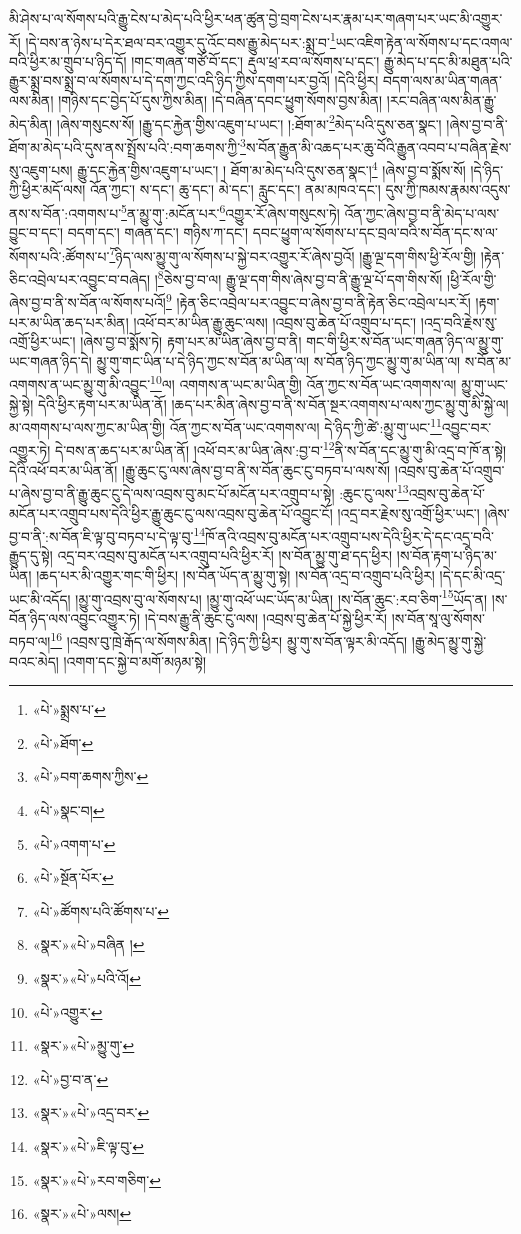 མི་ཤེས་པ་ལ་སོགས་པའི་རྒྱུ་ངེས་པ་མེད་པའི་ཕྱིར་ཕན་ཚུན་བྱེ་བྲག་ངེས་པར་རྣམ་པར་གཞག་པར་ཡང་མི་འགྱུར་རོ། །དེ་བས་ན་ཉེས་པ་དེར་ཐལ་བར་འགྱུར་དུ་འོང་བས་རྒྱུ་མེད་པར་:སྨྲ་བ་\footnote{«པེ་»སྨྲས་པ་}ཡང་འཇིག་རྟེན་ལ་སོགས་པ་དང་འགལ་བའི་ཕྱིར་མ་གྲུབ་པ་ཉིད་དོ། །གང་གཞན་གཙོ་བོ་དང་། རྡུལ་ཕྲ་རབ་ལ་སོགས་པ་དང་། རྒྱུ་མེད་པ་དང་མི་མཐུན་པའི་རྒྱུར་སྨྲ་བས་སྨྲ་བ་ལ་སོགས་པ་དེ་དག་ཀྱང་འདི་ཉིད་ཀྱིས་དགག་པར་བྱའོ། །དེའི་ཕྱིར། བདག་ལས་མ་ཡིན་གཞན་ལས་མིན། །གཉིས་དང་བྱེད་པོ་དུས་ཀྱིས་མིན། །དེ་བཞིན་དབང་ཕྱུག་སོགས་བྱས་མིན། །རང་བཞིན་ལས་མིན་རྒྱུ་མེད་མིན། །ཞེས་གསུངས་སོ། །རྒྱུ་དང་རྐྱེན་གྱིས་འཇུག་པ་ཡང་། །:ཐོག་མ་\footnote{«པེ་»ཐོག་}མེད་པའི་དུས་ཅན་སྣང་། །ཞེས་བྱ་བ་ནི་ཐོག་མ་མེད་པའི་དུས་ནས་སྤྲོས་པའི་:བག་ཆགས་ཀྱི་\footnote{«པེ་»བག་ཆགས་ཀྱིས་}ས་བོན་རྒྱུན་མི་འཆད་པར་ཆུ་བོའི་རྒྱུན་འབབ་པ་བཞིན་རྗེས་སུ་འཇུག་པས། རྒྱུ་དང་རྐྱེན་གྱིས་འཇུག་པ་ཡང་། །
ཐོག་མ་མེད་པའི་དུས་ཅན་སྣང་།\footnote{«པེ་»སྣང་བ།} །ཞེས་བྱ་བ་སྨོས་སོ། །དེ་ཉིད་ཀྱི་ཕྱིར་མདོ་ལས། འོན་ཀྱང་། ས་དང་། ཆུ་དང་། མེ་དང་། རླུང་དང་། ནམ་མཁའ་དང་། དུས་ཀྱི་ཁམས་རྣམས་འདུས་ནས་ས་བོན་:འགགས་པ་\footnote{«པེ་»འགག་པ་}ན་མྱུ་གུ་:མངོན་པར་\footnote{«པེ་»སྔོན་པོར་}འགྱུར་རོ་ཞེས་གསུངས་ཏེ། འོན་ཀྱང་ཞེས་བྱ་བ་ནི་མེད་པ་ལས་བྱུང་བ་དང་། བདག་དང་། གཞན་དང་། གཉིས་ཀ་དང་། དབང་ཕྱུག་ལ་སོགས་པ་དང་བྲལ་བའི་ས་བོན་དང་ས་ལ་སོགས་པའི་:ཚོགས་པ་\footnote{«པེ་»ཚོགས་པའི་ཚོགས་པ་}ཉིད་ལས་མྱུ་གུ་ལ་སོགས་པ་སྐྱེ་བར་འགྱུར་རོ་ཞེས་བྱའོ། །རྒྱུ་ལྔ་དག་གིས་ཕྱི་རོལ་གྱི། །རྟེན་ཅིང་འབྲེལ་པར་འབྱུང་བ་བཞེད། །\footnote{«སྣར་»«པེ་»བཞིན །}ཅེས་བྱ་བ་ལ། རྒྱུ་ལྔ་དག་གིས་ཞེས་བྱ་བ་ནི་རྒྱུ་ལྔ་པོ་དག་གིས་སོ། །ཕྱི་རོལ་གྱི་ཞེས་བྱ་བ་ནི་ས་བོན་ལ་སོགས་པའོ།\footnote{«སྣར་»«པེ་»པའི་འོ།} །རྟེན་ཅིང་འབྲེལ་པར་འབྱུང་བ་ཞེས་བྱ་བ་ནི་རྟེན་ཅིང་འབྲེལ་པར་རོ། །རྟག་པར་མ་ཡིན་ཆད་པར་མིན། །འཕོ་བར་མ་ཡིན་རྒྱུ་ཆུང་ལས། །འབྲས་བུ་ཆེན་པོ་འགྲུབ་པ་དང་། །འདྲ་བའི་རྗེས་སུ་འགྲོ་ཕྱིར་ཡང་། །ཞེས་བྱ་བ་སྨོས་ཏེ། རྟག་པར་མ་ཡིན་ཞེས་བྱ་བ་ནི། གང་གི་ཕྱིར་ས་བོན་ཡང་གཞན་ཉིད་ལ་མྱུ་གུ་ཡང་གཞན་ཉིད་དེ། མྱུ་གུ་གང་ཡིན་པ་དེ་ཉིད་ཀྱང་ས་བོན་མ་ཡིན་ལ། ས་བོན་ཉིད་ཀྱང་མྱུ་གུ་མ་ཡིན་ལ། ས་བོན་མ་འགགས་ན་ཡང་མྱུ་གུ་མི་འབྱུང་\footnote{«པེ་»འགྱུར་}ལ། འགགས་ན་ཡང་མ་ཡིན་གྱི། འོན་ཀྱང་ས་བོན་ཡང་འགགས་ལ། མྱུ་གུ་ཡང་སྐྱེ་སྟེ། དེའི་ཕྱིར་རྟག་པར་མ་ཡིན་ནོ། །ཆད་པར་མིན་ཞེས་བྱ་བ་ནི་ས་བོན་སྔར་འགགས་པ་ལས་ཀྱང་མྱུ་གུ་མི་སྐྱེ་ལ། མ་འགགས་པ་ལས་ཀྱང་མ་ཡིན་གྱི། འོན་ཀྱང་ས་བོན་ཡང་འགགས་ལ། དེ་ཉིད་ཀྱི་ཚེ་:མྱུ་གུ་ཡང་\footnote{«སྣར་»«པེ་»མྱུ་གུ་}འབྱུང་བར་འགྱུར་ཏེ། དེ་བས་ན་ཆད་པར་མ་ཡིན་ནོ། །འཕོ་བར་མ་ཡིན་ཞེས་:བྱ་བ་\footnote{«པེ་»བྱ་བ་ན་}ནི་ས་བོན་དང་མྱུ་གུ་མི་འདྲ་བ་ཁོ་ན་སྟེ། དེའི་འཕོ་བར་མ་ཡིན་ནོ། །རྒྱུ་ཆུང་ངུ་ལས་ཞེས་བྱ་བ་ནི་ས་བོན་ཆུང་ངུ་བཏབ་པ་ལས་སོ། །འབྲས་བུ་ཆེན་པོ་འགྲུབ་པ་ཞེས་བྱ་བ་ནི་རྒྱུ་ཆུང་ངུ་དེ་ལས་འབྲས་བུ་མང་པོ་མངོན་པར་འགྲུབ་པ་སྟེ། :ཆུང་ངུ་ལས་\footnote{«སྣར་»«པེ་»འདྲ་བར་}འབྲས་བུ་ཆེན་པོ་མངོན་པར་འགྲུབ་པས་དེའི་ཕྱིར་རྒྱུ་ཆུང་ངུ་ལས་འབྲས་བུ་ཆེན་པོ་འབྱུང་ངོ། །འདྲ་བར་རྗེས་སུ་འགྲོ་ཕྱིར་ཡང་། །ཞེས་བྱ་བ་ནི་:ས་བོན་ཇི་ལྟ་བུ་བཏབ་པ་དེ་ལྟ་བུ་\footnote{«སྣར་»«པེ་»ཇི་ལྟ་བུ་}ཁོ་ནའི་འབྲས་བུ་མངོན་པར་འགྲུབ་པས་དེའི་ཕྱིར་དེ་དང་འདྲ་བའི་རྒྱུད་དུ་སྟེ། འདྲ་བར་འབྲས་བུ་མངོན་པར་འགྲུབ་པའི་ཕྱིར་རོ། །ས་བོན་མྱུ་གུ་ཐ་དད་ཕྱིར། །ས་བོན་རྟག་པ་ཉིད་མ་ཡིན། །ཆད་པར་མི་འགྱུར་གང་གི་ཕྱིར། །ས་བོན་ཡོད་ན་མྱུ་གུ་སྟེ། །ས་བོན་འདྲ་བ་འགྲུབ་པའི་ཕྱིར། །དེ་དང་མི་འདྲ་ཡང་མི་འདོད། །མྱུ་གུ་འབྲས་བུ་ལ་སོགས་པ། །མྱུ་གུ་འཕོ་ཡང་ཡོད་མ་ཡིན། །ས་བོན་ཆུང་:རབ་ཅིག་\footnote{«སྣར་»«པེ་»རབ་གཅིག་}ཡོད་ན། །ས་བོན་ཉིད་ལས་འབྱུང་འགྱུར་ཏེ། །དེ་བས་རྒྱུ་ནི་ཆུང་ངུ་ལས། །འབྲས་བུ་ཆེན་པོ་སྐྱེ་ཕྱིར་རོ། །ས་བོན་སཱ་ལུ་སོགས་བཏབ་ལ།\footnote{«སྣར་»«པེ་»ལས།} །འབྲས་བུ་ཁྲེ་རྒོད་ལ་སོགས་མིན། །དེ་ཉིད་ཀྱི་ཕྱིར། མྱུ་གུ་ས་བོན་ལྟར་མི་འདོད། །རྒྱུ་མེད་མྱུ་གུ་སྐྱེ་བའང་མེད། །འགག་དང་སྐྱེ་བ་མགོ་མཉམ་སྟེ། 